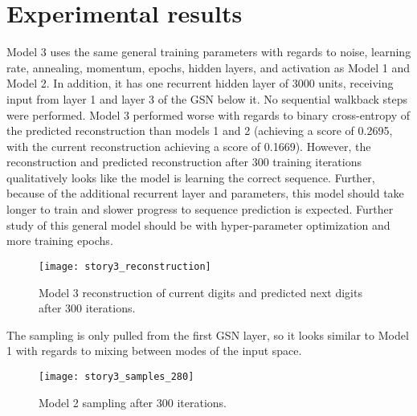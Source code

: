 \section{Experimental results}
Model 3 uses the same general training parameters with regards to noise, learning rate, annealing, momentum, epochs, hidden layers, and activation as Model 1 and Model 2. In addition, it has one recurrent hidden layer of 3000 units, receiving input from layer 1 and layer 3 of the GSN below it. No sequential walkback steps were performed. Model 3 performed worse with regards to binary cross-entropy of the predicted reconstruction than models 1 and 2 (achieving a score of 0.2695, with the current reconstruction achieving a score of 0.1669). However, the reconstruction and predicted reconstruction after 300 training iterations qualitatively looks like the model is learning the correct sequence. Further, because of the additional recurrent layer and parameters, this model should take longer to train and slower progress to sequence prediction is expected. Further study of this general model should be with hyper-parameter optimization and more training epochs.

\begin{figure}[h!]
  \centering
    \texttt{[image: story3\_reconstruction]}
\caption{Model 3 reconstruction of current digits and predicted next digits after 300 iterations.}
\end{figure}

The sampling is only pulled from the first GSN layer, so it looks similar to Model 1 with regards to mixing between modes of the input space.
\begin{figure}[h!]
  \centering
    \texttt{[image: story3\_samples\_280]}
\caption{Model 2 sampling after 300 iterations.}
\end{figure}